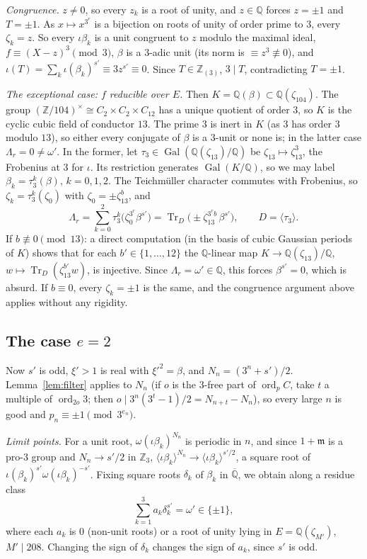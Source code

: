 \documentclass[11pt]{amsart}
\theoremstyle{definition}
\newcommand{\Z}{\mathbb{Z}}
\newcommand{\Q}{\mathbb{Q}}
\newcommand{\Qbar}{\overline{\mathbb{Q}}}
\newcommand{\Tr}{\operatorname{Tr}}
\newcommand{\ord}{\operatorname{ord}}
\newcommand{\Gal}{\operatorname{Gal}}
\begin{document}
\emph{Congruence.}  $z\neq0$, so every $z_k$ is a root of unity, and $z\in\Q$ forces $z=\pm1$ and $T=\pm1$.  As $x\mapsto x^{3^r}$ is a bijection on roots of unity of order prime to $3$, every $\zeta_k=z$.  So every $\iota\beta_k$ is a unit congruent to $z$ modulo the maximal ideal, $f\equiv(X-z)^3\pmod 3$, $\beta$ is a $3$-adic unit (its norm is $\equiv z^3\not\equiv 0$), and $\iota(T)=\sum_k\iota(\beta_k)^{s'}\equiv3z^{s'}\equiv0$.  Since $T\in\Z_{(3)}$, $3\mid T$, contradicting $T=\pm1$.

\emph{The exceptional case: $f$ reducible over $E$.}  Then $K=\Q(\beta)\subset\Q(\zeta_{104})$.  The group $(\Z/104)^\times\cong C_2\times C_2\times C_{12}$ has a unique quotient of order $3$, so $K$ is the cyclic cubic field of conductor $13$.  The prime $3$ is inert in $K$ (as $3$ has order $3$ modulo $13$), so either every conjugate of $\beta$ is a $3$-unit or none is; in the latter case $\Lambda_r=0\neq\omega'$.  In the former, let $\tau_3\in\Gal(\Q(\zeta_{13})/\Q)$ be $\zeta_{13}\mapsto\zeta_{13}^3$, the Frobenius at $3$ for $\iota$.  Its restriction generates $\Gal(K/\Q)$, so we may label $\beta_k=\tau_3^k(\beta)$, $k=0,1,2$.  The Teichm\"uller character commutes with Frobenius, so $\zeta_k=\tau_3^k(\zeta_0)$ with $\zeta_0=\pm\zeta_{13}^b$, and
\[ \Lambda_r=\sum_{k=0}^2\tau_3^k\big(\zeta_0^{3^r}\beta^{s'}\big)=\Tr_D\big(\pm\zeta_{13}^{3^rb}\,\beta^{s'}\big),\qquad D=\langle\tau_3\rangle . \]
If $b\not\equiv0\pmod{13}$: a direct computation (in the basis of cubic Gaussian periods of $K$) shows that for each $b'\in\{1,\dots,12\}$ the $\Q$-linear map $K\to\Q(\zeta_{13})/\Q$, $w\mapsto\Tr_D(\zeta_{13}^{b'}w)$, is injective.  Since $\Lambda_r=\omega'\in\Q$, this forces $\beta^{s'}=0$, which is absurd.  If $b\equiv0$, every $\zeta_k=\pm1$ is the same, and the congruence argument above applies without any rigidity.

\subsection{The case $e=2$}
Now $s'$ is odd, $\xi'>1$ is real with $\xi'^2=\beta$, and $N_n=(3^n+s')/2$.  Lemma~\ref{lem:filter} applies to $N_n$ (if $o$ is the $3$-free part of $\ord_p C$, take $t$ a multiple of $\ord_{2o}3$; then $o\mid 3^n(3^t-1)/2=N_{n+t}-N_n$), so every large $n$ is good and $p_n\equiv\pm1\pmod{3^{e_n}}$.

\emph{Limit points.}  For a unit root, $\omega(\iota\beta_k)^{N_n}$ is periodic in $n$, and since $1+\mathfrak m$ is a pro-$3$ group and $N_n\to s'/2$ in $\Z_3$, $\langle\iota\beta_k\rangle^{N_n}\to\langle\iota\beta_k\rangle^{s'/2}$, a square root of $\iota(\beta_k)^{s'}\omega(\iota\beta_k)^{-s'}$.  Fixing square roots $\delta_k$ of $\beta_k$ in $\Qbar$, we obtain along a residue class
\begin{equation}\label{eq:delta}
\sum_{k=1}^3a_k\delta_k^{s'}=\omega'\in\{\pm1\},
\end{equation}
where each $a_k$ is $0$ (non-unit roots) or a root of unity lying in $E=\Q(\zeta_{M'})$, $M'\mid208$.  Changing the sign of $\delta_k$ changes the sign of $a_k$, since $s'$ is odd.
\end{document}
